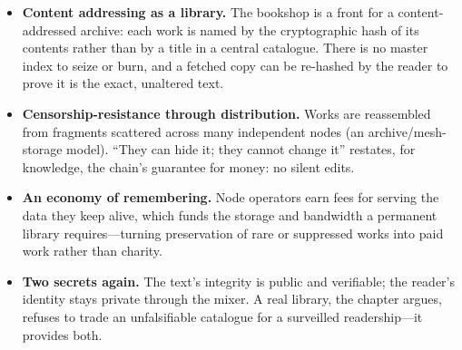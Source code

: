 \begin{itemize}
\tightlist
\item
  \textbf{Content addressing as a library.} The bookshop is a front for a
  content-addressed archive: each work is named by the cryptographic hash of its
  contents rather than by a title in a central catalogue. There is no master index
  to seize or burn, and a fetched copy can be re-hashed by the reader to prove it
  is the exact, unaltered text.
\item
  \textbf{Censorship-resistance through distribution.} Works are reassembled from
  fragments scattered across many independent nodes (an archive/mesh-storage
  model). ``They can hide it; they cannot change it'' restates, for knowledge, the
  chain's guarantee for money: no silent edits.
\item
  \textbf{An economy of remembering.} Node operators earn fees for serving the
  data they keep alive, which funds the storage and bandwidth a permanent library
  requires---turning preservation of rare or suppressed works into paid work
  rather than charity.
\item
  \textbf{Two secrets again.} The text's integrity is public and verifiable; the
  reader's identity stays private through the mixer. A real library, the chapter
  argues, refuses to trade an unfalsifiable catalogue for a surveilled
  readership---it provides both.
\end{itemize}
